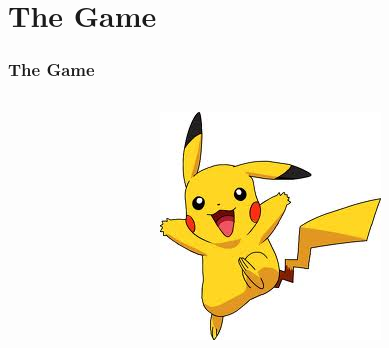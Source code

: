 \documentclass{beamer}
\begin{document}
\section{The Game}
\begin{frame}
	\frametitle{The Game}
	\begin{columns}
		\begin{column}{0.4\linewidth}
			\tableofcontents[currentsection,subsectionstyle=show/show/hide]
		\end{column}
		\begin{column}{0.5\linewidth}
			\vfill
			\begin{figure}
				\begin{center}
					\includegraphics[width=\textwidth]{slides/images/pikachu.jpeg}
				\end{center}
			\end{figure}
		\end{column}
	\end{columns}
\end{frame}
\end{document}
